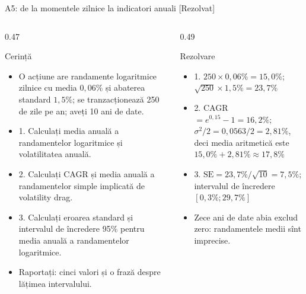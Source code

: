 \begin{frame}{A5: de la momentele zilnice la indicatori anuali [Rezolvat]}
\itemsize{\footnotesize}
\begin{columns}[T]
\begin{column}{0.47\textwidth}
\begin{block}{Cerință}
\begin{itemize}
    \item O acțiune are randamente logaritmice zilnice cu media $0{,}06\%$ și abaterea standard $1{,}5\%$; se tranzacționează 250 de zile pe an; aveți 10 ani de date.
    \item 1. Calculați media anuală a randamentelor logaritmice și volatilitatea anuală.
    \item 2. Calculați CAGR și media anuală a randamentelor simple implicată de volatility drag.
    \item 3. Calculați eroarea standard și intervalul de încredere 95\% pentru media anuală a randamentelor logaritmice.
    \item Raportați: cinci valori și o frază despre lățimea intervalului.
\end{itemize}
\end{block}
\end{column}
\begin{column}{0.49\textwidth}
\begin{exampleblock}{Rezolvare}
\begin{itemize}
    \item 1. $250 \times 0{,}06\% = 15{,}0\%$; $\sqrt{250} \times 1{,}5\% = 23{,}7\%$
    \item 2. CAGR $= e^{0{,}15} - 1 = 16{,}2\%$; $\sigma^2/2 = 0{,}0563/2 = 2{,}81\%$, deci media aritmetică este $15{,}0\% + 2{,}81\% \approx 17{,}8\%$
    \item 3. $\text{SE} = 23{,}7\%/\sqrt{10} = 7{,}5\%$; intervalul de încredere $[0{,}3\%; 29{,}7\%]$
    \item Zece ani de date abia exclud zero: randamentele medii sînt imprecise.
\end{itemize}
\end{exampleblock}
\end{column}
\end{columns}
\end{frame}

